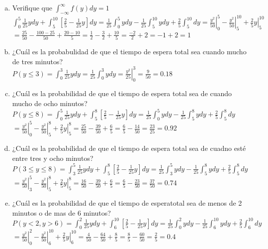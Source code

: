 \documentclass[12pt, letterpaper]{article}
\begin{document}
\begin{enumerate}[a)]
\begin{center}
\begin{tikzpicture}
		\end{tikzpicture}
	\end{center}
	\item Verifique que $\displaystyle\int_{-\infty}^\infty f(y)dy=1$\\
		$\displaystyle\int_0^5\frac{1}{25}ydy+\int_5^{10}\left[\frac{2}{5}-\frac{1}{25}y \right]dy=\frac{1}{25}\int_0^5ydy-\frac{1}{25}\int_5^{10}ydy+\frac{2}{5}\int_5^{10}dy=\left.\frac{y^2}{50}\right|_0^{5}- \left.\frac{y^2}{50}\right|_5^{10}+\left.\frac{2}{5}y\right|_5^{10}$\vskip0.1cm
		$=\displaystyle\frac{25}{50}-\frac{100-25}{50}+\frac{20-10}{5}=\frac{1}{2}-\frac{3}{2}+\frac{10}{5}=\frac{-2}{2}+2=-1+2=1$
	\item ¿Cuál es la probabulidad  de que el tiempo de espera total sea cuando mucho de tres minutos?\\
		$P(y\leq 3)=\displaystyle\int_0^3\frac{1}{25}ydy=\frac{1}{25}\int_0^3ydy=\left.\frac{y^2}{25}\right|_0^3=\frac{9}{50}=0.18$
	\item ¿Cuál es la probabilidad de que el tiempo de espera total sea de cuando mucho de ocho minutos?\\
		$P(y\leq 8)=\displaystyle\int_0^5\frac{1}{25}ydy+\int_5^8\left[\frac{2}{5}-\frac{1}{25}y \right]dy=\frac{1}{25}\int_0^5ydy-\frac{1}{25}\int_5^8ydy+\frac{2}{5}\int_5^8dy$\vskip0.1cm
		$=\displaystyle\left.\frac{y^2}{50}\right|_0^5- \left.\frac{y^2}{50}\right|_5^8+\left.\frac{2}{5}y\right|_5^8=\frac{25}{50}-\frac{39}{50}+\frac{6}{5}=\frac{6}{5}-\frac{14}{50}=\frac{23}{25}=0.92$
	\item ¿Cuál es la probabilidad de que el tiempo de espera total sea de cuadno esté entre tres y ocho minutos?\\
		$P(3\leq y\leq 8)=\displaystyle\int_3^5\frac{1}{25}ydy+\int_5^8\left[\frac{2}{5}-\frac{1}{25}y \right]dy=\frac{1}{25}\int_3^5ydy-\frac{1}{25}\int_5^8ydy+\frac{2}{5}\int_5^8dy$\vskip0.1cm
		$=\displaystyle\left.\frac{y^2}{50}\right|_3^5- \left.\frac{y^2}{50}\right|_5^8+\left.\frac{2}{5}y\right|_5^8=\frac{16}{50}-\frac{39}{50}+\frac{6}{5}=\frac{6}{5}-\frac{23}{50}=\frac{37}{50}=0.74$
	\item ¿Cuál es la probabilidad de que el tiempo de esperatotal sea de menos de 2 minutos o de mas de 6 minutos?\\
	$P(y<2,y>6)=\displaystyle\int_0^2\frac{1}{25}ydy+\int_6^{10}\left[\frac{2}{5}-\frac{1}{25}y \right]dy=\frac{1}{25}\int_0^2ydy-\frac{1}{25}\int_6^{10}ydy+\frac{2}{5}\int_6^{10}dy$\vskip0.1cm
	$=\displaystyle\left.\frac{y^2}{50}\right|_0^2- \left.\frac{y^2}{50}\right|_6^{10}+\left.\frac{2}{5}y\right|_6^{10}=\frac{4}{50}-\frac{64}{50}+\frac{8}{5}=\frac{8}{5}-\frac{60}{50}=\frac{2}{5}=0.4$
\end{enumerate}\vskip1cm
\end{document}
